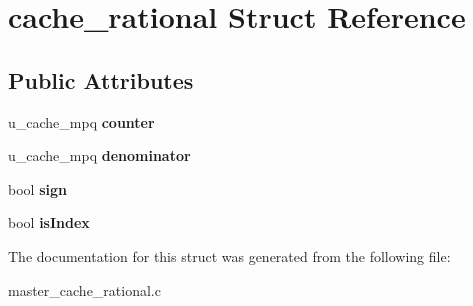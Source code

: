 \hypertarget{structcache__rational}{}\section{cache\+\_\+rational Struct Reference}
\label{structcache__rational}
\subsection*{Public Attributes}
\begin{DoxyCompactItemize}
\item 
u\+\_\+cache\+\_\+mpq {\bfseries counter}\hypertarget{structcache__rational_a54511df433a677949a075d9dcd828109}{}\label{structcache__rational_a54511df433a677949a075d9dcd828109}

\item 
u\+\_\+cache\+\_\+mpq {\bfseries denominator}\hypertarget{structcache__rational_a2b157940bfede9e63bf5848cecbb7493}{}\label{structcache__rational_a2b157940bfede9e63bf5848cecbb7493}

\item 
bool {\bfseries sign}\hypertarget{structcache__rational_ae10045d461089299a82d555814798ead}{}\label{structcache__rational_ae10045d461089299a82d555814798ead}

\item 
bool {\bfseries is\+Index}\hypertarget{structcache__rational_a2ccbc470d693c63a63932f86c840f702}{}\label{structcache__rational_a2ccbc470d693c63a63932f86c840f702}

\end{DoxyCompactItemize}


The documentation for this struct was generated from the following file\+:\begin{DoxyCompactItemize}
\item 
master\+\_\+cache\+\_\+rational.\+c\end{DoxyCompactItemize}
